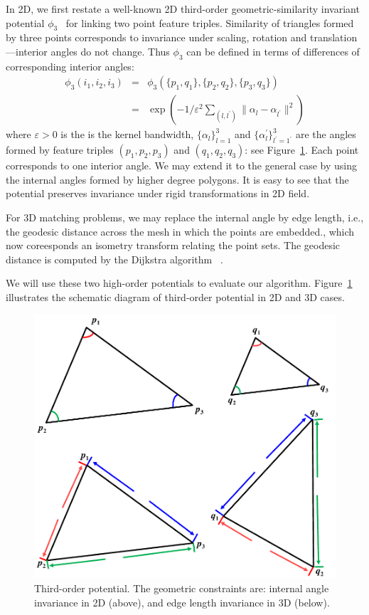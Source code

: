 In 2D, we first restate a well-known 2D third-order geometric-similarity invariant potential $\phi_3$~\cite{Duchenne09,Chertok10} for linking two point feature triples.
Similarity of triangles formed by three points corresponds to invariance under scaling, rotation and translation---interior angles do not change.
Thus $\phi_3$ can be defined in terms of differences of corresponding interior angles:
\begin{eqnarray}
\phi_3(i_1,i_2,i_3)&=&\phi_3(\{p_1,q_1\}, \{p_2,q_2\}, \{p_3,q_3\})\nonumber\\
&=&\exp(-1/\varepsilon^2\sum\nolimits_{(l,l^{'})}\lVert \alpha_l- \alpha_{l^{'} } \lVert^2 )
\end{eqnarray}
where $\varepsilon > 0$ is the is the kernel bandwidth,
$\{\alpha_l\}_{l=1}^3$ and $\{\alpha_l^{'}\}_{l^{'}=1^{'}}^{3}$ are the angles formed by feature triples $(p_1,p_2,p_3)$ and $(q_1,q_2,q_3)$:
see Figure~\ref{fig:TO}. Each point corresponds to one interior angle.
We may extend it to the general case by using the internal angles formed by higher degree polygons.
It is easy to see that the potential preserves invariance under rigid transformations in 2D field.

For 3D matching problems, we may replace the internal angle by edge length, i.e., the geodesic distance across the mesh in which the points are embedded., which now coreesponds
an isometry transform relating the point sets.
The geodesic distance is computed by the Dijkstra algorithm~\cite{Peyre2010} .

We will use these two high-order potentials to evaluate our algorithm.
Figure~\ref{fig:TO} illustrates the schematic diagram of third-order potential in 2D and 3D cases.

\begin{figure}
\centering
  \includegraphics[width=0.8\linewidth]{figures/diagram.pdf}
  \caption{Third-order potential. The geometric constraints are: internal angle invariance in 2D (above), and edge length invariance in 3D (below).}
\label{fig:TO}
\end{figure}

